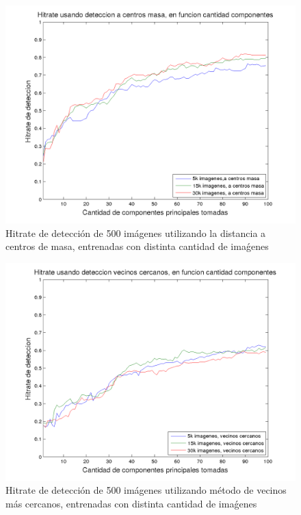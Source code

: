 \begin{figure}[H]
\begin {center}
\includegraphics[width=\hrwidth]{plots/HR_N2.png}
\end {center}
\caption{Hitrate de detecci\'on de 500 im\'agenes utilizando la distancia a
centros de masa, entrenadas con distinta cantidad de ima\'genes}
\label{fig:HRN2}
\end{figure}

\begin{figure}[H]
\begin {center}
\includegraphics[width=\hrwidth]{plots/HR_VEC.png}
\end {center}
\caption{Hitrate de detecci\'on de 500 im\'agenes utilizando m\'etodo de
vecinos m\'as cercanos, entrenadas con distinta cantidad de ima\'genes}
\label{fig:HRVEC}
\end{figure}

